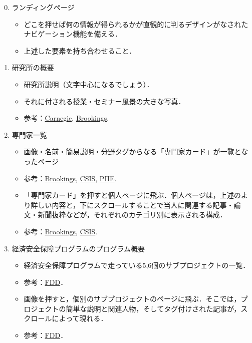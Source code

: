 \documentclass[uplatex,dvipdfmx]{jsarticle}
\begin{document}
\begin{enumerate}\setcounter{enumi}{-1}
    \item ランディングページ
    \begin{itemize}
        \item どこを押せば何の情報が得られるかが直観的に判るデザインがなされたナビゲーション機能を備える．
        \item 上述した要素を持ち合わせること．
    \end{itemize}
    \item 研究所の概要
    \begin{itemize}
        \item 研究所説明（文字中心になるでしょう）．
        \item それに付される授業・セミナー風景の大きな写真．
        \item 参考：\href{https://carnegieendowment.org/about/}{Carnegie}, \href{https://www.brookings.edu/about-us/}{Brookings}.
    \end{itemize}
    \item 専門家一覧
    \begin{itemize}
        \item 画像・名前・簡易説明・分野タグからなる「専門家カード」が一覧となったページ
        \item 参考：\href{https://www.brookings.edu/experts/}{Brookings}, \href{https://www.csis.org/about/people/experts}{CSIS}, \href{https://www.piie.com/experts}{PIIE}.
        \item 「専門家カード」を押すと個人ページに飛ぶ．個人ページは，上述のより詳しい内容と，下にスクロールすることで当人に関連する記事・論文・新聞抜粋などが，それぞれのカテゴリ別に表示される構成．
        \item 参考：\href{https://www.brookings.edu/author/hady-amr/}{Brookings}, \href{https://www.csis.org/people/michael-j-green}{CSIS}.
    \end{itemize}
    \item 経済安全保障プログラムのプログラム概要
    \begin{itemize}
        \item 経済安全保障プログラムで走っている5,6個のサブプロジェクトの一覧．
        \item 参考：\href{https://www.fdd.org/projects/}{FDD}．
        \item 画像を押すと，個別のサブプロジェクトのページに飛ぶ．そこでは，プロジェクトの簡単な説明と関連人物，そしてタグ付けされた記事が，スクロールによって現れる．
        \item 参考：\href{https://www.fdd.org/projects/center-on-cyber-and-technology-innovation/}{FDD}．

\end{itemize}
\end{enumerate}
\end{document}
